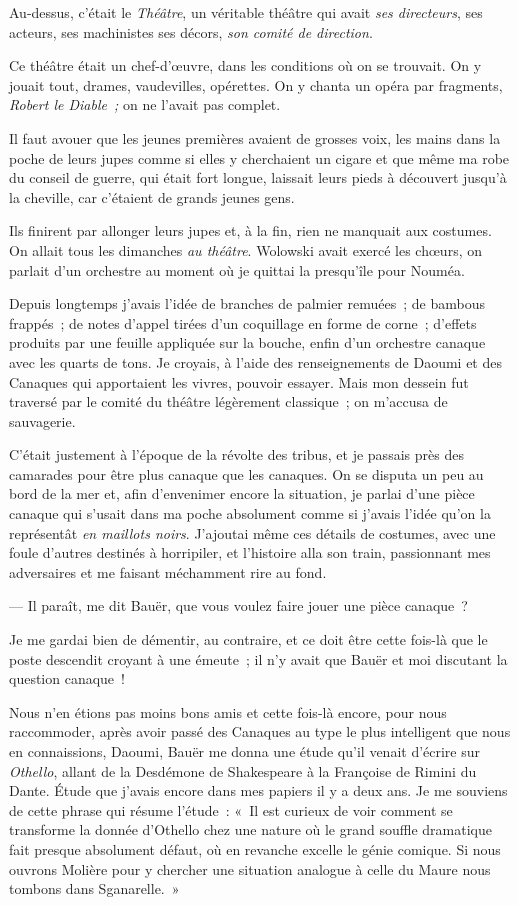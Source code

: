 \documentclass[french,twoside]{book} %
\begin{document}
Au-dessus, c’était le \emph{Théâtre}, un véritable théâtre qui avait \emph{ses directeurs}, ses acteurs, ses machinistes ses décors, \emph{son comité de direction}.\par
Ce théâtre était un chef-d’œuvre, dans les conditions où on se trouvait. On y jouait tout, drames, vaudevilles, opérettes. On y chanta un opéra par fragments, \emph{Robert le Diable ;} on ne l’avait pas complet.\par
Il faut avouer que les jeunes premières avaient de grosses voix, les mains dans la poche de leurs jupes comme si elles y cherchaient un cigare et que même ma robe du conseil de guerre, qui était fort longue, laissait leurs pieds à découvert jusqu’à la cheville, car c’étaient de grands jeunes gens.\par
Ils finirent par allonger leurs jupes et, à la fin,  rien ne manquait aux costumes. On allait tous les dimanches \emph{au théâtre}. Wolowski avait exercé les chœurs, on parlait d’un orchestre au moment où je quittai la presqu’île pour Nouméa.\par
Depuis longtemps j’avais l’idée de branches de palmier remuées ; de bambous frappés ; de notes d’appel tirées d’un coquillage en forme de corne ; d’effets produits par une feuille appliquée sur la bouche, enfin d’un orchestre canaque avec les quarts de tons. Je croyais, à l’aide des renseignements de Daoumi et des Canaques qui apportaient les vivres, pouvoir essayer. Mais mon dessein fut traversé par le comité du théâtre légèrement classique ; on m’accusa de sauvagerie.\par
C’était justement à l’époque de la révolte des tribus, et je passais près des camarades pour être plus canaque que les canaques. On se disputa un peu au bord de la mer et, afin d’envenimer encore la situation, je parlai d’une pièce canaque qui s’usait dans ma poche absolument comme si j’avais l’idée qu’on la représentât \emph{en maillots noirs}. J’ajoutai même ces détails de costumes, avec une foule d’autres destinés à horripiler, et l’histoire alla son train, passionnant mes adversaires et me faisant méchamment rire au fond.\par
— Il paraît, me dit Bauër, que vous voulez faire jouer une pièce canaque ?\par
 Je me gardai bien de démentir, au contraire, et ce doit être cette fois-là que le poste descendit croyant à une émeute ; il n’y avait que Bauër et moi discutant la question canaque !\par
Nous n’en étions pas moins bons amis et cette fois-là encore, pour nous raccommoder, après avoir passé des Canaques au type le plus intelligent que nous en connaissions, Daoumi, Bauër me donna une étude qu’il venait d’écrire sur \emph{Othello}, allant de la Desdémone de Shakespeare à la Françoise de Rimini du Dante. Étude que j’avais encore dans mes papiers il y a deux ans. Je me souviens de cette phrase qui résume l’étude : « Il est curieux de voir comment se transforme la donnée d’Othello chez une nature où le grand souffle dramatique fait presque absolument défaut, où en revanche excelle le génie comique. Si nous ouvrons Molière pour y chercher une situation analogue à celle du Maure nous tombons dans Sganarelle. »\par
\end{document}
